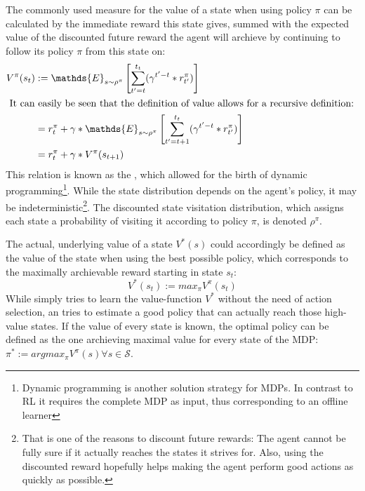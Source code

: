 The commonly used measure for the value of a state when using policy $\pi$ can be calculated by the immediate reward this state gives, summed with the expected value of the discounted future reward the agent will archieve by continuing to follow its policy $\pi$ from this state on:
\begin{align} 
	V^\pi(s_t) &:= \mathds{E}_{s\sim\rho^\pi} \left[  \sum_{t'=t}^{t_t} ( \gamma^{t'-t} * r^\pi_{t'} ) \right]  \label{eq:valuedefinition} \\
\intertext{	
It can easily be seen that the definition of value allows for a recursive definition:
}
	&= r_t^\pi + \gamma * \mathds{E}_{s\sim\rho^\pi} \left[  \sum_{t'=t+1}^{t_t} ( \gamma^{t'-t} * r^\pi_{t'} ) \right]  \nonumber \\
	&= r_t^\pi + \gamma * V^\pi(s_{t+1}) \label{statebellman}
\end{align}
This relation is known as the , which allowed for the birth of dynamic programming\footnote{Dynamic programming is another solution strategy for MDPs. In contrast to RL it requires the complete MDP as input, thus corresponding to an offline learner}. While the state distribution depends on the agent's policy, it may be indeterministic\footnote{That is one of the reasons to discount future rewards: The agent cannot be fully sure if it actually reaches the states it strives for. Also, using the discounted reward hopefully helps making the agent perform good actions as quickly as possible.}. The discounted state visitation distribution, which assigns each state a probability of visiting it according to policy $\pi$, is denoted $\rho^\pi$. 

The actual, underlying value of a state $V^*(s)$ could accordingly be defined as the value of the state when using the best possible policy, which corresponds to the maximally archievable reward starting in state $s_t$:
\begin{equation*} 
V^*(s_t) := max_\pi V^\pi(s_t)
\end{equation*}
While  simply tries to learn the value-function $V^*$ without the need of action selection, an  tries to estimate a good policy that can actually reach those high-value states. If the value of every state is known, the optimal policy can be defined as the one archieving maximal value for every state of the MDP: \mbox{$\pi^* := argmax_\pi V^\pi(s) \forall s \in \mathcal{S}$}. 


